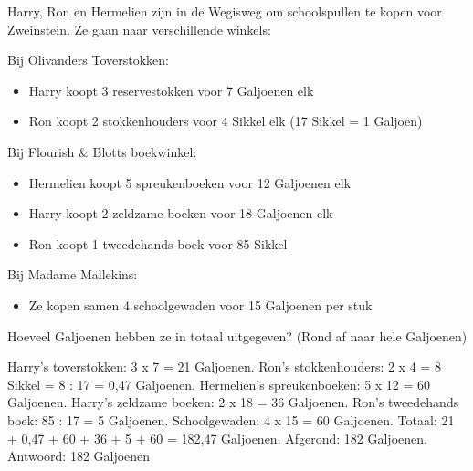 \begin{opgave}
Harry, Ron en Hermelien zijn in de Wegisweg om schoolspullen te kopen voor Zweinstein. Ze gaan naar verschillende winkels:

Bij Olivanders Toverstokken:
\begin{itemize}
\item Harry koopt 3 reservestokken voor 7 Galjoenen elk
\item Ron koopt 2 stokkenhouders voor 4 Sikkel elk (17 Sikkel = 1 Galjoen)
\end{itemize}

Bij Flourish \& Blotts boekwinkel:
\begin{itemize}
\item Hermelien koopt 5 spreukenboeken voor 12 Galjoenen elk
\item Harry koopt 2 zeldzame boeken voor 18 Galjoenen elk
\item Ron koopt 1 tweedehands boek voor 85 Sikkel
\end{itemize}

Bij Madame Mallekins:
\begin{itemize}
\item Ze kopen samen 4 schoolgewaden voor 15 Galjoenen per stuk
\end{itemize}

Hoeveel Galjoenen hebben ze in totaal uitgegeven? (Rond af naar hele Galjoenen)
\end{opgave}

\begin{oplossing}
Harry's toverstokken: 3 x 7 = 21 Galjoenen.
Ron's stokkenhouders: 2 x 4 = 8 Sikkel = 8 : 17 = 0,47 Galjoenen.
Hermelien's spreukenboeken: 5 x 12 = 60 Galjoenen.
Harry's zeldzame boeken: 2 x 18 = 36 Galjoenen.
Ron's tweedehands boek: 85 : 17 = 5 Galjoenen.
Schoolgewaden: 4 x 15 = 60 Galjoenen.
Totaal: 21 + 0,47 + 60 + 36 + 5 + 60 = 182,47 Galjoenen.
Afgerond: 182 Galjoenen.
Antwoord: 182 Galjoenen
\end{oplossing}